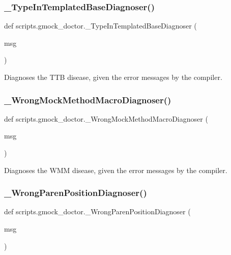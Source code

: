 \subsubsection{\texorpdfstring{\_TypeInTemplatedBaseDiagnoser()}{\_TypeInTemplatedBaseDiagnoser()}}
{\footnotesize\ttfamily def scripts.\+gmock\+\_\+doctor.\+\_\+\+Type\+In\+Templated\+Base\+Diagnoser (\begin{DoxyParamCaption}\item[{}]{msg }\end{DoxyParamCaption})\hspace{0.3cm}{\ttfamily [private]}}

\begin{DoxyVerb}Diagnoses the TTB disease, given the error messages by the compiler.\end{DoxyVerb}
 \mbox{\label{namespacescripts_1_1gmock__doctor_a2c0900fea0e3c4a3556b19bd9ed7126c}} 
\subsubsection{\texorpdfstring{\_WrongMockMethodMacroDiagnoser()}{\_WrongMockMethodMacroDiagnoser()}}
{\footnotesize\ttfamily def scripts.\+gmock\+\_\+doctor.\+\_\+\+Wrong\+Mock\+Method\+Macro\+Diagnoser (\begin{DoxyParamCaption}\item[{}]{msg }\end{DoxyParamCaption})\hspace{0.3cm}{\ttfamily [private]}}

\begin{DoxyVerb}Diagnoses the WMM disease, given the error messages by the compiler.\end{DoxyVerb}
 \mbox{\label{namespacescripts_1_1gmock__doctor_aff422d37d1505c339b2cc861f37aa869}} 
\subsubsection{\texorpdfstring{\_WrongParenPositionDiagnoser()}{\_WrongParenPositionDiagnoser()}}
{\footnotesize\ttfamily def scripts.\+gmock\+\_\+doctor.\+\_\+\+Wrong\+Paren\+Position\+Diagnoser (\begin{DoxyParamCaption}\item[{}]{msg }\end{DoxyParamCaption})\hspace{0.3cm}{\ttfamily [private]}}


